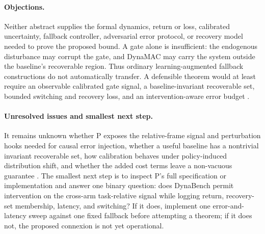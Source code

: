 \documentclass{article}
\begin{document}
\paragraph{Objections.}
Neither abstract supplies the formal dynamics, return or loss, calibrated uncertainty, fallback controller, adversarial error protocol, or recovery model needed to prove the proposed bound.  A gate alone is insufficient: the endogenous disturbance may corrupt the gate, and DynaMAC may carry the system outside the baseline's recoverable region.  Thus ordinary learning-augmented fallback constructions do not automatically transfer.  A defensible theorem would at least require an observable calibrated gate signal, a baseline-invariant recoverable set, bounded switching and recovery loss, and an intervention-aware error budget .

\paragraph{Unresolved issues and smallest next step.}
It remains unknown whether P exposes the relative-frame signal and perturbation hooks needed for causal error injection, whether a useful baseline has a nontrivial invariant recoverable set, how calibration behaves under policy-induced distribution shift, and whether the added cost terms leave a non-vacuous guarantee .  The smallest next step is to inspect P's full specification or implementation and answer one binary question: does DynaBench permit intervention on the cross-arm task-relative signal while logging return, recovery-set membership, latency, and switching?  If it does, implement one error-and-latency sweep against one fixed fallback before attempting a theorem; if it does not, the proposed connexion is not yet operational.
\end{document}
